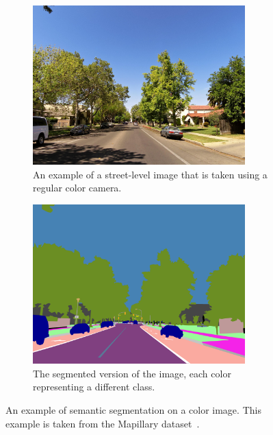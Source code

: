 \begin{figure}
    \centering
    \begin{subfigure}{0.45\textwidth}
    	\centering
    	\includegraphics[width=0.9\textwidth]{figures/background/raw.jpg} %
    	\caption{An example of a street-level image that is taken using a regular color camera.} \label{fig:background-raw}
    \end{subfigure}
	\hfill
    \begin{subfigure}{0.45\textwidth}
        \centering
        \includegraphics[width=0.9\textwidth]{figures/background/segmented.png} %
        \caption{The segmented version of the image, each color representing a different class.} \label{fig:background-segmented}
    \end{subfigure}
	\caption[An example of semantic segmentation.]{An example of semantic segmentation on a color image. This example is taken from the Mapillary dataset~\cite{mapillary}.}
\end{figure}